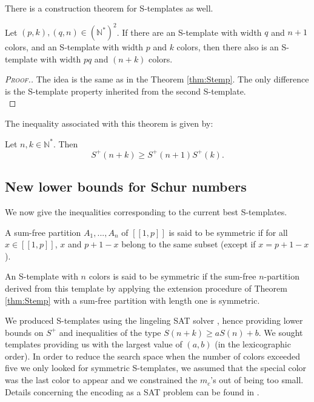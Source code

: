 There is a construction theorem for S-templates as well.

\begin{theorem}
	Let \((p,k), (q,n) \in (\mathbb{N}^*)^2\). If there are an S-template with width \(q\) and \(n+1\) colors,
	and an S-template with width \(p\) and \(k\) colors, then there also is an S-template with width \(pq\) and \((n+k)\) 
	colors.
\end{theorem}

\begin{proof}[\textsc{Proof.}]
The idea is the same as in the Theorem \ref{thm:Stemp}. The only difference is the S-template property inherited 
from the second S-template. \\
\end{proof}
	
The inequality associated with this theorem is given by:
	
\begin{corollary}
	Let \(n, k \in \mathbb{N}^*\). Then
	\[ S^+(n+k) \geqslant S^+(n+1)S^+(k).\]
\end{corollary}


\subsection{New lower bounds for Schur numbers}
\label{subsec:lowS}

We now give the inequalities corresponding to the current  best S-templates.

\begin{definition}
A sum-free partition \(A_1, ..., A_n\) of \([\![1, p]\!]\) is said to be symmetric if for all \( x \in [\![1, p]\!]\), 
\(x\) and \(p + 1 - x\) belong to the same subset (except if \(x = p + 1 - x\)).

An S-template with \(n\) colors is said to be symmetric if the sum-free \(n\)-partition derived 
from this template by applying the extension procedure of Theorem \ref{thm:Stemp} with a sum-free 
partition with length one is symmetric. 
\end{definition}

We produced S-templates using the lingeling SAT solver \cite{Lingeling2017}, hence providing lower bounds on 
\(S^+\) and inequalities of the type \(S(n+k) \geqslant a S(n) + b\). We sought templates providing us with 
the largest value of \((a, b)\) (in the lexicographic order). In order to reduce the search space when the number 
of colors exceeded five we only looked for symmetric S-templates, we assumed that the special color was the last 
color to appear and we constrained the \(m_c\)'s out of being too small. Details concerning the encoding as a SAT 
problem can be found in \cite{Heule2017}.

